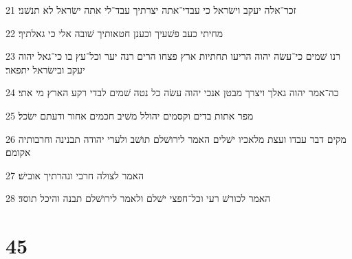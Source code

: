 \par 21 זכר־אלה יעקב וישׂראל כי עבדי־אתה יצרתיך עבד־לי אתה ישׂראל לא תנשׁני׃
\par 22 מחיתי כעב פשׁעיך וכענן חטאותיך שׁובה אלי כי גאלתיך׃
\par 23 רנו שׁמים כי־עשׂה יהוה הריעו תחתיות ארץ פצחו הרים רנה יער וכל־עץ בו כי־גאל יהוה יעקב ובישׂראל יתפאר׃
\par 24 כה־אמר יהוה גאלך ויצרך מבטן אנכי יהוה עשׂה כל נטה שׁמים לבדי רקע הארץ מי אתי׃
\par 25 מפר אתות בדים וקסמים יהולל משׁיב חכמים אחור ודעתם ישׂכל׃
\par 26 מקים דבר עבדו ועצת מלאכיו ישׁלים האמר לירושׁלם תושׁב ולערי יהודה תבנינה וחרבותיה אקומם׃
\par 27 האמר לצולה חרבי ונהרתיך אובישׁ׃
\par 28 האמר לכורשׁ רעי וכל־חפצי ישׁלם ולאמר לירושׁלם תבנה והיכל תוסד׃

\chapter{45}

